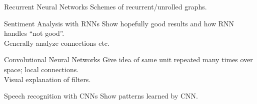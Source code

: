 \documentclass{beamer}
\begin{document}
\begin{frame}{Recurrent Neural Networks}
Schemes of recurrent/unrolled graphs.
\end{frame}


\begin{frame}{Sentiment Analysis with RNNs}
Show hopefully good results and how RNN handles ``not good''.\\
Generally analyze connections etc.
\end{frame}


\begin{frame}{Convolutional Neural Networks}
Give idea of same unit repeated many times over space; local connections.\\
Visual explanation of filters.
\end{frame}


\begin{frame}{Speech recognition with CNNs}
Show patterns learned by CNN.
\end{frame}
\end{document}
